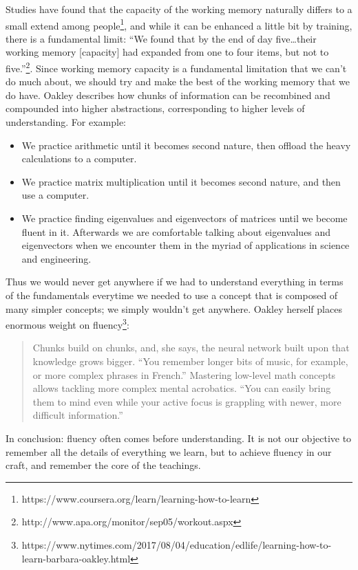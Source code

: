 Studies have found that the capacity of the working memory naturally
differs to a small extend among people\footnote{https://www.coursera.org/learn/learning-how-to-learn},
and while it can be enhanced a little bit by training, there is a
fundamental limit: ``We found that by the end of day five\ldots{}their
working memory {[}capacity{]} had expanded from one to four items, but
not to five.''\footnote{http://www.apa.org/monitor/sep05/workout.aspx}.
Since working memory capacity is a fundamental limitation that we can't
do much about, we should try and make the best of the working memory
that we do have. Oakley describes how chunks of information can be
recombined and compounded into higher abstractions, corresponding to
higher levels of understanding. For example:

\begin{itemize}
\tightlist
\item
  We practice arithmetic until it becomes second nature, then offload
  the heavy calculations to a computer.
\item
  We practice matrix multiplication until it becomes second nature, and
  then use a computer.
\item
  We practice finding eigenvalues and eigenvectors of matrices until we
  become fluent in it. Afterwards we are comfortable talking about
  eigenvalues and eigenvectors when we encounter them in the myriad of
  applications in science and engineering.
\end{itemize}

Thus we would never get anywhere if we had to understand everything in
terms of the fundamentals everytime we needed to use a concept that is
composed of many simpler concepts; we simply wouldn't get anywhere.
Oakley herself places enormous weight on fluency\footnote{https://www.nytimes.com/2017/08/04/education/edlife/learning-how-to-learn-barbara-oakley.html}:

\begin{quote}
Chunks build on chunks, and, she says, the neural network built upon
that knowledge grows bigger. ``You remember longer bits of music, for
example, or more complex phrases in French.'' Mastering low-level math
concepts allows tackling more complex mental acrobatics. ``You can
easily bring them to mind even while your active focus is grappling with
newer, more difficult information.''
\end{quote}

In conclusion: fluency often comes before understanding. It is not our
objective to remember all the details of everything we learn, but to
achieve fluency in our craft, and remember the core of the teachings.

